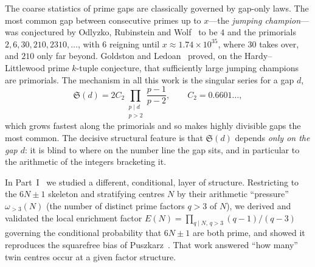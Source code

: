 \documentclass[11pt]{article}
\theoremstyle{remark}\newtheorem{remark}{Remark}
\begin{document}
The coarse statistics of prime gaps are classically governed by gap-only laws.
The most common gap between consecutive primes up to $x$---the \emph{jumping
champion}---was conjectured by Odlyzko, Rubinstein and Wolf~\cite{ORW} to be $4$
and the primorials $2,6,30,210,2310,\dots$, with $6$ reigning until
$x\approx1.74\times10^{35}$, where $30$ takes over, and $210$ only far beyond.
Goldston and Ledoan~\cite{GL} proved, on the Hardy--Littlewood prime $k$-tuple
conjecture, that sufficiently large jumping champions are primorials. The
mechanism in all this work is the singular series for a gap $d$,
\[
  \mathfrak{S}(d)=2C_2\prod_{\substack{p\mid d\\ p>2}}\frac{p-1}{p-2},
  \qquad C_2=0.6601\ldots,
\]
which grows fastest along the primorials and so makes highly divisible gaps the
most common. The decisive structural feature is that $\mathfrak{S}(d)$ depends
\emph{only on the gap $d$}: it is blind to where on the number line the gap sits,
and in particular to the arithmetic of the integers bracketing it.

In Part~I~\cite{ChenI} we studied a different, conditional, layer of structure.
Restricting to the $6N\pm1$ skeleton and stratifying centres $N$ by their
arithmetic ``pressure'' $\omega_{>3}(N)$ (the number of distinct prime factors
$q>3$ of $N$), we derived and validated the local enrichment factor
$E(N)=\prod_{q\mid N,\,q>3}(q-1)/(q-3)$ governing the conditional probability
that $6N\pm1$ are both prime, and showed it reproduces the squarefree bias of
Puszkarz~\cite{Pusz}. That work answered ``how many'' twin centres occur at a
given factor structure.
\end{document}
